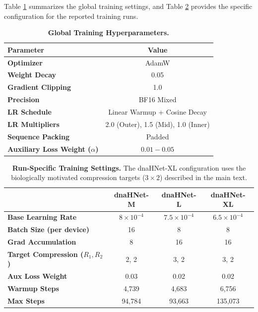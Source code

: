 \documentclass{article}
\theoremstyle{plain}
\theoremstyle{definition}
\theoremstyle{remark}
\begin{document}
Table \ref{tab:training_hyperparams} summarizes the global training settings, and Table \ref{tab:run_specifics} provides the specific configuration for the reported training runs.

\begin{table}[h]
\centering
\caption{\textbf{Global Training Hyperparameters.}}
\label{tab:training_hyperparams}
\begin{small}
\begin{tabular}{lc}
\toprule
\textbf{Parameter} & \textbf{Value} \\
\midrule
\textbf{Optimizer} & AdamW \\
\textbf{Weight Decay} & 0.05 \\
\textbf{Gradient Clipping} & 1.0 \\
\textbf{Precision} & BF16 Mixed \\
\textbf{LR Schedule} & Linear Warmup + Cosine Decay \\
\textbf{LR Multipliers} & 2.0 (Outer), 1.5 (Mid), 1.0 (Inner) \\
\textbf{Sequence Packing} & Padded \\
\textbf{Auxiliary Loss Weight ($\alpha$)} & $0.01 - 0.05$ \\
\bottomrule
\end{tabular}
\end{small}
\end{table}

\begin{table}[h]
\centering
\caption{\textbf{Run-Specific Training Settings.} The dnaHNet-XL configuration uses the biologically motivated compression targets ($3 \times 2$) described in the main text.}
\label{tab:run_specifics}
\begin{small}
\begin{tabular}{lccc}
\toprule
 & \textbf{dnaHNet-M} & \textbf{dnaHNet-L} & \textbf{dnaHNet-XL} \\
\midrule
\textbf{Base Learning Rate} & $8 \times 10^{-4}$ & $7.5 \times 10^{-4}$ & $6.5 \times 10^{-4}$ \\
\textbf{Batch Size (per device)} & 16 & 8 & 8 \\
\textbf{Grad Accumulation} & 8 & 16 & 16 \\
\textbf{Target Compression ($R_1, R_2$)} & 2, 2 & 3, 2 & 3, 2 \\
\textbf{Aux Loss Weight} & 0.03 & 0.02 & 0.02 \\
\textbf{Warmup Steps} & 4,739 & 4,683 & 6,756 \\
\textbf{Max Steps} & 94,784 & 93,663 & 135,073 \\
\bottomrule
\end{tabular}
\end{small}
\end{table}
\end{document}
